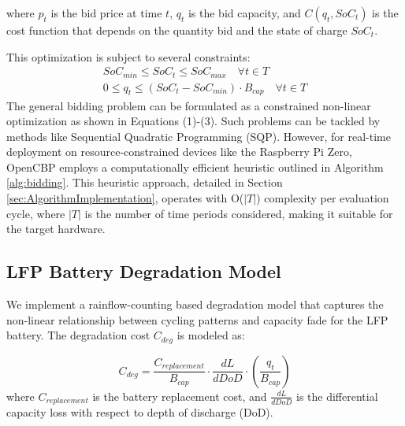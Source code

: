 \documentclass[11pt,a4paper]{article}
\begin{document}
where $p_t$ is the bid price at time $t$, $q_t$ is the bid capacity, and $C(q_t, SoC_t)$ is the cost function that depends on the quantity bid and the state of charge $SoC_t$.

This optimization is subject to several constraints:
\begin{align}
SoC_{min} \leq SoC_t \leq SoC_{max} \quad \forall t \in T\\
0 \leq q_t \leq (SoC_t - SoC_{min}) \cdot B_{cap} \quad \forall t \in T
\end{align}
The general bidding problem can be formulated as a constrained non-linear optimization as shown in Equations (1)-(3). Such problems can be tackled by methods like Sequential Quadratic Programming (SQP). However, for real-time deployment on resource-constrained devices like the Raspberry Pi Zero, OpenCBP employs a computationally efficient heuristic outlined in Algorithm \ref{alg:bidding}. This heuristic approach, detailed in Section \ref{sec:AlgorithmImplementation}, operates with O($|T|$) complexity per evaluation cycle, where $|T|$ is the number of time periods considered, making it suitable for the target hardware.

\subsection{LFP Battery Degradation Model}
We implement a rainflow-counting based degradation model that captures the non-linear relationship between cycling patterns and capacity fade for the LFP battery. The degradation cost $C_{deg}$ is modeled as:

\begin{equation}
C_{deg} = \frac{C_{replacement}}{B_{cap}} \cdot \frac{dL}{dDoD} \cdot \left( \frac{q_t}{B_{cap}} \right)
\end{equation}
where $C_{replacement}$ is the battery replacement cost, and $\frac{dL}{dDoD}$ is the differential capacity loss with respect to depth of discharge (DoD).
\end{document}
